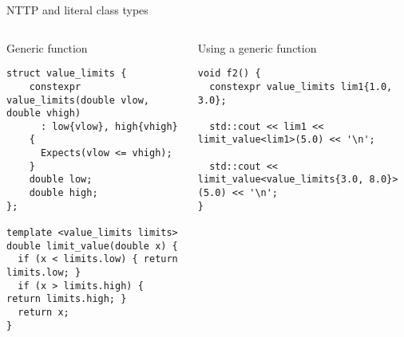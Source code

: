 \begin{frame}[t,fragile]{NTTP and literal class types}
\begin{columns}[T]

\begin{block}{Generic function}
\begin{lstlisting}
struct value_limits {
    constexpr value_limits(double vlow, double vhigh)
      : low{vlow}, high{vhigh} 
    {
      Expects(vlow <= vhigh);
    }
    double low;
    double high;
};

template <value_limits limits>
double limit_value(double x) {
  if (x < limits.low) { return limits.low; }
  if (x > limits.high) { return limits.high; }
  return x;
}
\end{lstlisting}
\end{block}

\begin{block}{Using a generic function}
\begin{lstlisting}[basicstyle=\tiny]
void f2() {
  constexpr value_limits lim1{1.0, 3.0};
  
  std::cout << lim1 << limit_value<lim1>(5.0) << '\n';

  std::cout << limit_value<value_limits{3.0, 8.0}>(5.0) << '\n';
}
\end{lstlisting}
\end{block}

\end{columns}
\end{frame}
